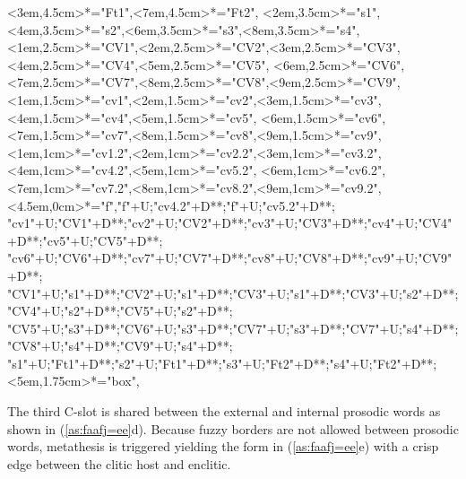 \begin{multicols}{2}
\begin{exe}
{\begin{xlist}
{		<3em,4.5cm>*="Ft1",<7em,4.5cm>*="Ft2",
		<2em,3.5cm>*="s1",<4em,3.5cm>*="s2",<6em,3.5cm>*="s3",<8em,3.5cm>*="s4",
		<1em,2.5cm>*="CV1",<2em,2.5cm>*="CV2",<3em,2.5cm>*="CV3",<4em,2.5cm>*="CV4",<5em,2.5cm>*="CV5",
		<6em,2.5cm>*="CV6",<7em,2.5cm>*="CV7",<8em,2.5cm>*="CV8",<9em,2.5cm>*="CV9",
		<1em,1.5cm>*="cv1",<2em,1.5cm>*="cv2",<3em,1.5cm>*="cv3",<4em,1.5cm>*="cv4",<5em,1.5cm>*\as{\j}="cv5",
		<6em,1.5cm>*="cv6",<7em,1.5cm>*\as{ }="cv7",<8em,1.5cm>*="cv8",<9em,1.5cm>*\as{ }="cv9",
		<1em,1cm>*="cv1.2",<2em,1cm>*="cv2.2",<3em,1cm>*="cv3.2",<4em,1cm>*="cv4.2",<5em,1cm>*\as{\j}="cv5.2",
		<6em,1cm>*="cv6.2",<7em,1cm>*\as{ }="cv7.2",<8em,1cm>*="cv8.2",<9em,1cm>*\as{ }="cv9.2",
		<4.5em,0cm>*\as{\tsc{[+fr.]}}="f","f"+U;"cv4.2"+D**\dir{-};"f"+U;"cv5.2"+D**\dir{-};
		"cv1"+U;"CV1"+D**\dir{-};"cv2"+U;"CV2"+D**\dir{-};"cv3"+U;"CV3"+D**\dir{-};"cv4"+U;"CV4"+D**\dir{-};"cv5"+U;"CV5"+D**\dir{-};
		"cv6"+U;"CV6"+D**\dir{-};"cv7"+U;"CV7"+D**\dir{};"cv8"+U;"CV8"+D**\dir{-};"cv9"+U;"CV9"+D**\dir{};
		"CV1"+U;"s1"+D**\dir{-};"CV2"+U;"s1"+D**\dir{-};"CV3"+U;"s1"+D**\dir{-};"CV3"+U;"s2"+D**\dir{-};"CV4"+U;"s2"+D**\dir{-};"CV5"+U;"s2"+D**\dir{-};
		"CV5"+U;"s3"+D**\dir{-};"CV6"+U;"s3"+D**\dir{-};"CV7"+U;"s3"+D**\dir{-};"CV7"+U;"s4"+D**\dir{-};"CV8"+U;"s4"+D**\dir{-};"CV9"+U;"s4"+D**\dir{-};
		"s1"+U;"Ft1"+D**\dir{-};"s2"+U;"Ft1"+D**\dir{-};"s3"+U;"Ft2"+D**\dir{-};"s4"+U;"Ft2"+D**\dir{-};
		<5em,1.75cm>*="box",
	\endxy}\label{as:faafj=ee2}
	\end{xlist}}
\end{exe}
\end{multicols}

The third C-slot is shared between the external and internal prosodic
words as shown in (\ref{as:faafj=ee}d).
Because fuzzy borders are not allowed between prosodic words,
metathesis is triggered yielding the form in (\ref{as:faafj=ee}e) with
a crisp edge between the clitic host and enclitic.

